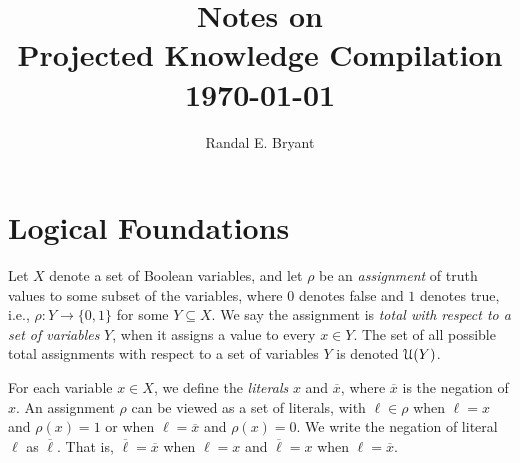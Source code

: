 \documentclass[letterpaper,USenglish,cleveref, autoref, thm-restate]{lipics-v2021}
\title{Notes on \\ Projected Knowledge Compilation \\ \today }
\author{Randal E. Bryant}{Computer Science Department, Carnegie Mellon University, Pittsburgh, PA 15213 USA}{Randy.Bryant@cs.cmu.edu}{https://orcid.org/0000-0001-5024-6613}{Supported by NSF grant CCF-2108521}
\newcommand{\obar}[1]{\overline{#1}}
\newcommand{\lit}{\ell}
\newcommand{\varset}{X}
\newcommand{\assign}{\rho}
\newcommand{\uassign}{{\cal U}}
\begin{document}
\maketitle

\section{Logical Foundations}

  Let $\varset$ denote a set of Boolean variables, and let $\assign$
  be an \emph{assignment} of truth values to some subset of the
  variables, where $0$ denotes false and $1$ denotes true, i.e.,
  $\assign \colon Y \rightarrow \{0,1\}$ for some $Y  \subseteq \varset$.
We say the assignment is \emph{total with respect to a set of variables} $Y$, when it assigns a value to every $x \in Y$.
  The set of all possible total assignments with respect to a set of variables $Y$ is denoted $\uassign(Y)$.


For each variable $x \in \varset$,
  we define the \emph{literals} $x$ and $\obar{x}$, where $\obar{x}$ is the
  negation of $x$. An
  assignment $\assign$ can be viewed as a set of literals, with
   $\lit \in \assign$ when $\lit = x$ and $\assign(x) = 1$ or when
  $\lit = \obar{x}$ and $\assign(x) = 0$.  We write the negation of literal $\lit$ as $\obar{\lit}$.  That is, $\obar{\lit} = \obar{x}$ when $\lit = x$ and
$\obar{\lit} = x$ when $\lit = \obar{x}$.
\end{document}
